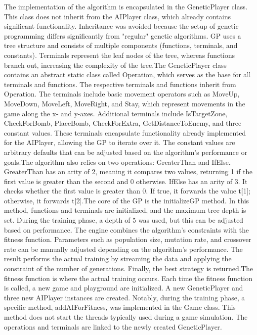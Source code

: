 \documentclass[sigconf]{acmart} %
\begin{document}
The implementation of the algorithm is encapsulated in the GeneticPlayer class. This class does not inherit from the AIPlayer class, which already contains significant functionality. Inheritance was avoided because the setup of genetic programming differs significantly from "regular" genetic algorithms. GP uses a tree structure and consists of multiple components (functions, terminals, and constants). Terminals represent the leaf nodes of the tree, whereas functions branch out, increasing the complexity of the tree.The GeneticPlayer class contains an abstract static class called Operation, which serves as the base for all terminals and functions. The respective terminals and functions inherit from Operation. The terminals include basic movement operators such as MoveUp, MoveDown, MoveLeft, MoveRight, and Stay, which represent movements in the game along the x- and y-axes. Additional terminals include IsTargetZone, CheckForBomb, PlaceBomb, CheckForExtra, GetDistanceToEnemy, and three constant values. These terminals encapsulate functionality already implemented for the AIPlayer, allowing the GP to iterate over it. The constant values are arbitrary defaults that can be adjusted based on the algorithm's performance or goals.The algorithm also relies on two operations: GreaterThan and IfElse. GreaterThan has an arity of 2, meaning it compares two values, returning 1 if the first value is greater than the second and 0 otherwise. IfElse has an arity of 3. It checks whether the first value is greater than 0. If true, it forwards the value t[1]; otherwise, it forwards t[2].The core of the GP is the initializeGP method. In this method, functions and terminals are initialized, and the maximum tree depth is set. During the training phase, a depth of 5 was used, but this can be adjusted based on performance. The engine combines the algorithm's constraints with the fitness function. Parameters such as population size, mutation rate, and crossover rate can be manually adjusted depending on the algorithm's performance. The result performs the actual training by streaming the data and applying the constraint of the number of generations. Finally, the best strategy is returned.The fitness function is where the actual training occurs. Each time the fitness function is called, a new game and playground are initialized. A new GeneticPlayer and three new AIPlayer instances are created. Notably, during the training phase, a specific method, addAIForFitness, was implemented in the Game class. This method does not start the threads typically used during a game simulation. The operations and terminals are linked to the newly created GeneticPlayer. 
\end{document}
